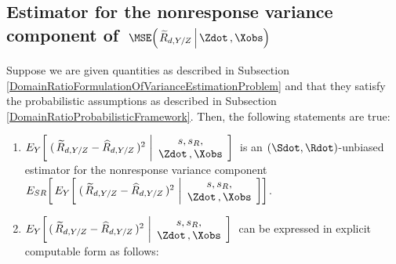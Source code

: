 \subsection{Estimator for the nonresponse variance component of
\,$\MSE\!\left(\left.\widetilde{R}_{d,Y/Z}\,\right\vert\Zdot\,,\Xobs\right)$}
\setcounter{theorem}{0}


\vskip 0.1cm
\begin{lemma}
\label{DomainRatioNonresponseVariance}
\mbox{}
\vskip 0.1cm
\noindent
Suppose we are given quantities as described in Subsection
\ref{DomainRatioFormulationOfVarianceEstimationProblem}
and
that they satisfy the probabilistic assumptions as described in Subsection
\ref{DomainRatioProbabilisticFramework}.
\vskip 0.1cm
\noindent
Then, the following statements are true:
\renewcommand{\theenumi}{\roman{enumi}}
\renewcommand{\labelenumi}{\mbox{}\;\;\,(\theenumi)$\quad$}
\begin{enumerate}
\item
    $
    E_{Y}\!\left[\;
        (\,\widetilde{R}_{d,Y/Z} - \widehat{R}_{d,Y/Z}\,)^{2}
        \,\left\vert
        \begin{array}{c}
            s,s_{R},
            \\
            \Zdot\,,\Xobs
            \end{array}
        \right.
        \!\right]
    $\,
    is an $(\Sdot,\Rdot)$-unbiased estimator for the nonresponse variance component
    \,$
    E_{SR}\!\left[\,
    E_{Y}\!\left[\;
        (\,\widetilde{R}_{d,Y/Z} - \widehat{R}_{d,Y/Z}\,)^{2}
        \,\left\vert
        \begin{array}{c}
            s,s_{R},
            \\
            \Zdot\,,\Xobs
            \end{array}
        \right.
        \!\right]
        \right]
    $.
\item
    $
    E_{Y}\!\left[\,
        (\,\widetilde{R}_{d,Y/Z} - \widehat{R}_{d,Y/Z}\,)^{2}
        \,\left\vert
        \begin{array}{c}
            s,s_{R},
            \\
            \Zdot\,,\Xobs
            \end{array}
        \right.
        \!\right]
    $\,
    can be expressed in explicit computable form as follows:
    \begin{eqnarray*}
    &&

\end{eqnarray*}
\end{enumerate}
\end{lemma}
